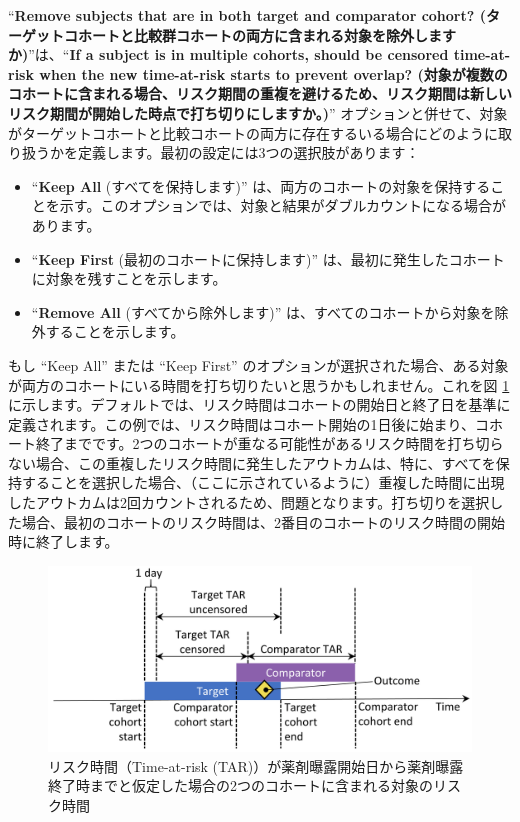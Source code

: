 \documentclass[
  11pt]{book}
\theoremstyle{definition}
\theoremstyle{definition}
\theoremstyle{definition}
\theoremstyle{definition}
\theoremstyle{remark}
\begin{document}
``\textbf{Remove subjects that are in both target and comparator cohort? (ターゲットコホートと比較群コホートの両方に含まれる対象を除外しますか)}''は、``\textbf{If a subject is in multiple cohorts, should be censored time-at-risk when the new time-at-risk starts to prevent overlap? (対象が複数のコホートに含まれる場合、リスク期間の重複を避けるため、リスク期間は新しいリスク期間が開始した時点で打ち切りにしますか。)}'' オプションと併せて、対象がターゲットコホートと比較コホートの両方に存在するいる場合にどのように取り扱うかを定義します。最初の設定には3つの選択肢があります：

\begin{itemize}
\item
  ``\textbf{Keep All} (すべてを保持します)'' は、両方のコホートの対象を保持することを示す。このオプションでは、対象と結果がダブルカウントになる場合があります。
\item
  ``\textbf{Keep First} (最初のコホートに保持します)'' は、最初に発生したコホートに対象を残すことを示します。
\item
  ``\textbf{Remove All} (すべてから除外します)'' は、すべてのコホートから対象を除外することを示します。
\end{itemize}

もし ``Keep All'' または ``Keep First'' のオプションが選択された場合、ある対象が両方のコホートにいる時間を打ち切りたいと思うかもしれません。これを図 \ref{fig:tar} に示します。デフォルトでは、リスク時間はコホートの開始日と終了日を基準に定義されます。この例では、リスク時間はコホート開始の1日後に始まり、コホート終了までです。2つのコホートが重なる可能性があるリスク時間を打ち切らない場合、この重複したリスク時間に発生したアウトカムは、特に、すべてを保持することを選択した場合、（ここに示されているように）重複した時間に出現したアウトカムは2回カウントされるため、問題となります。打ち切りを選択した場合、最初のコホートのリスク時間は、2番目のコホートのリスク時間の開始時に終了します。

\begin{figure}

{\centering \includegraphics[width=0.9\linewidth]{images/PopulationLevelEstimation/tar} 

}

\caption{リスク時間（Time-at-risk (TAR)）が薬剤曝露開始日から薬剤曝露終了時までと仮定した場合の2つのコホートに含まれる対象のリスク時間}\label{fig:tar}
\end{figure}
\end{document}

